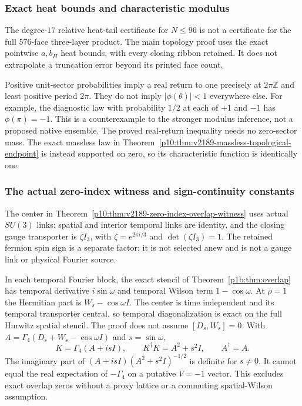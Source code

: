 \documentclass[12pt,a4paper]{article}
\begin{document}
\subsubsection{Exact heat bounds and characteristic modulus}
The degree-$17$ relative heat-tail certificate for $N\le96$ is not a
certificate for the full $576$-face three-layer product. The main topology
proof uses the exact pointwise $a,b_H$ heat bounds, with every closing
ribbon retained. It does not extrapolate a truncation error beyond its
printed face count.

Positive unit-sector probabilities imply a real return to one precisely
at $2\pi\mathbb Z$ and least positive period $2\pi$. They do not imply
$|\phi(\theta)|<1$ everywhere else. For example, the diagnostic law with
probability $1/2$ at each of $+1$ and $-1$ has $\phi(\pi)=-1$.
This is a counterexample to the stronger modulus inference, not a proposed
native ensemble. The proved real-return inequality needs no zero-sector mass.
The exact massless law in
Theorem~\ref{p10:thm:v2189-massless-topological-endpoint} is instead
supported on zero, so its characteristic function is identically one.


\subsubsection{The actual zero-index witness and sign-continuity constants}
The center in Theorem~\ref{p10:thm:v2189-zero-index-overlap-witness}
uses actual $SU(3)$ links: spatial and interior temporal links are identity,
and the closing gauge transporter is $\zeta I_3$, with
$\zeta=e^{2\pi i/3}$ and $\det(\zeta I_3)=1$.
The retained fermion spin sign is a separate factor; it is not selected
anew and is not a gauge link or physical Fourier source.

In each temporal Fourier block, the exact stencil of
Theorem~\ref{p1b:thm:overlap} has temporal derivative $i\sin\omega$ and
temporal Wilson term $1-\cos\omega$. At $\rho=1$ the Hermitian part is
$W_s-\cos\omega I$. The center is time independent and its temporal
transporter central, so temporal diagonalization is exact on the full
Hurwitz spatial stencil. The proof does not assume $[D_s,W_s]=0$.
With $A=\Gamma_4(D_s+W_s-\cos\omega I)$ and $s=\sin\omega$,
\[
 K=\Gamma_4(A+i sI),\qquad K^\dagger K=A^2+s^2I,
 \qquad A^\dagger=A.
\]
The imaginary part of $(A+i sI)(A^2+s^2I)^{-1/2}$ is definite for
$s\ne0$. It cannot equal the real expectation of $-\Gamma_4$ on a
putative $V=-1$ vector. This excludes exact overlap zeros without a
proxy lattice or a commuting spatial-Wilson assumption.
\end{document}
